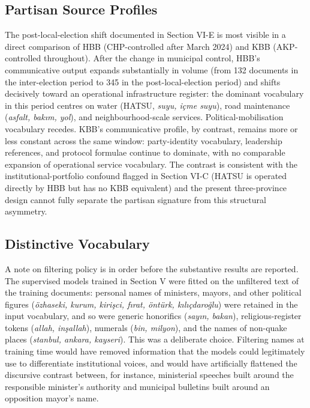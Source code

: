 \documentclass[12pt, journal]{IEEEtran}
\begin{document}
\subsection{Partisan Source Profiles}
The post-local-election shift documented in Section VI-E is most visible in a direct comparison of HBB (CHP-controlled after March 2024) and KBB (AKP-controlled throughout). After the change in municipal control, HBB's communicative output expands substantially in volume (from 132 documents in the inter-election period to 345 in the post-local-election period) and shifts decisively toward an operational infrastructure register: the dominant vocabulary in this period centres on water (HATSU, \textit{suyu, i\c{c}me suyu}), road maintenance (\textit{asfalt, bak\i m, yol}), and neighbourhood-scale services. Political-mobilisation vocabulary recedes. KBB's communicative profile, by contrast, remains more or less constant across the same window: party-identity vocabulary, leadership references, and protocol formulae continue to dominate, with no comparable expansion of operational service vocabulary. The contrast is consistent with the institutional-portfolio confound flagged in Section VI-C (HATSU is operated directly by HBB but has no KBB equivalent) and the present three-province design cannot fully separate the partisan signature from this structural asymmetry.

\subsection{Distinctive Vocabulary}
A note on filtering policy is in order before the substantive results are reported. The supervised models trained in Section V were fitted on the unfiltered text of the training documents: personal names of ministers, mayors, and other political figures (\textit{\"ozhaseki, kurum, kiri\c{s}ci, f\i rat, \"ont\"urk, k\i l\i\c{c}daro\u{g}lu}) were retained in the input vocabulary, and so were generic honorifics (\textit{say\i n, bakan}), religious-register tokens (\textit{allah, in\c{s}allah}), numerals (\textit{bin, milyon}), and the names of non-quake places (\textit{stanbul, ankara, kayseri}). This was a deliberate choice. Filtering names at training time would have removed information that the models could legitimately use to differentiate institutional voices, and would have artificially flattened the discursive contrast between, for instance, ministerial speeches built around the responsible minister's authority and municipal bulletins built around an opposition mayor's name.
\end{document}
